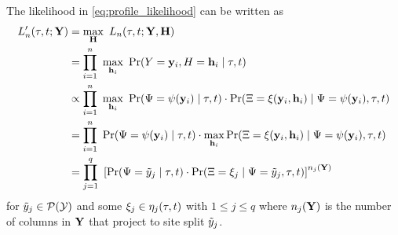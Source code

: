 The likelihood in \eqref{eq:profile_likelihood} can be written as
\begin{align}
L_\nCols'(\tau, t; \fullAlignment) &= \max_{\fullAncestralStates} \ L_\nCols(\tau, t; \fullAlignment, \fullAncestralStates) \nonumber \\
                             &= \prod_{i=1}^{\nCols} \ \max_{\ancestralStateColumn_i} \ \Pr(\alignmentColumnRV=\alignmentColumn_i, \ancestralStateColumnRV=\ancestralStateColumn_i \mid \tau, t) \nonumber \\
                             &\propto \prod_{i=1}^{\nCols} \ \max_{\ancestralStateColumn_i} \ \Pr(\siteSplitRV=\patternToSplit(\alignmentColumn_i) \mid \tau, t) \cdot \Pr(\ancestralSplitRV=\ancestralToSplit(\alignmentColumn_i, \ancestralStateColumn_i) \mid \siteSplitRV=\patternToSplit(\alignmentColumn_i), \tau, t) \nonumber \\
                             &= \prod_{i=1}^{\nCols} \ \Pr(\siteSplitRV=\patternToSplit(\alignmentColumn_i) \mid \tau, t) \cdot \max_{\ancestralStateColumn_i} \Pr(\ancestralSplitRV=\ancestralToSplit(\alignmentColumn_i, \ancestralStateColumn_i) \mid \siteSplitRV=\patternToSplit(\alignmentColumn_i), \tau, t) \nonumber \\
                             &= \prod_{j=1}^{\nSiteSplits} \ \left[\Pr(\siteSplitRV=\siteSplit_j \mid \tau, t)\cdot \Pr(\ancestralSplitRV=\xi_j \mid \siteSplitRV=\siteSplit_j, \tau, t)\right] ^{\nCols_j(\fullAlignment)} \label{eq:site_pattern_likelihood}
\end{align}
for $\tilde{y}_j\in\mathcal{P}(\mathcal{Y})$ and some $\xi_j\in\eta_j(\tau, t)$ with $1 \le j \le q$ where $n_j(\mathbf{Y})$ is the number of columns in $\mathbf{Y}$ that project to site split $\tilde{y}_j$.

